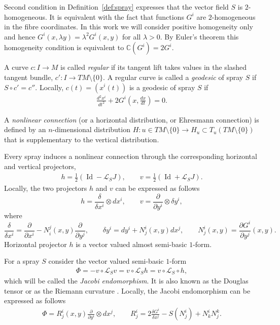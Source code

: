 Second condition in Def\/inition~\ref{def:spray} expresses that the
vector f\/ield $S$ is $2$-homogeneous. It is equivalent with the
fact that functions $G^i$ are $2$-homogeneous in the f\/ibre
coordinates. In this work we will consider positive homogeneity
only and hence $G^i(x,\lambda y)=\lambda^2 G^i(x,y)$
for all $\lambda>0$. By Euler's theorem this homogeneity condition is equivalent to
$\mathbb{C}(G^i)=2G^i$.

A curve $c:I \to M$ is called \emph{regular} if its tangent lift takes
values in the slashed tangent bundle, $c': I \to
TM\setminus\{0\}$. A regular curve is called a \emph{geodesic} of
spray $S$ if $S\circ c'=c''$. Locally, $c(t)=(x^i(t))$ is a
geodesic of spray $S$ if
\begin{gather*}
\frac{d^2x^i}{dt^2}+2G^i\left(x,\frac{dx}{dt}\right)=0.
\end{gather*}

\begin{Definition} A \emph{nonlinear connection} (or a horizontal
distribution, or Ehresmann connection) is def\/ined by an
$n$-dimensional distribution $H: u\in TM\setminus\{0\} \to
H_u\subset T_u(TM\setminus\{0\})$ that is supplementary to the
vertical distribution. \end{Definition}

Every spray induces a nonlinear connection through the
corresponding horizontal and vertical projectors, \cite{grifone72}
\begin{gather*}
h=\frac{1}{2}\left(\operatorname{Id}-\mathcal{L}_SJ\right), \qquad
v=\frac{1}{2}\left(\operatorname{Id}+\mathcal{L}_SJ\right).
\end{gather*} Locally, the two projectors $h$ and $v$ can
be expressed as follows
\[
h=\frac{\delta}{\delta x^i} \otimes dx^i, \qquad
v=\frac{\partial}{\partial y^i}\otimes \delta y^i,
\] where
\[
\frac{\delta}{\delta x^i}=\frac{\partial}{\partial
x^i}-N^j_i(x,y)\frac{\partial}{\partial y^j}, \qquad \delta y^i=dy^i+
N^i_j(x,y)dx^j, \qquad N^i_j(x,y)=\frac{\partial G^i}{\partial y^j}(x,y).
\]
Horizontal projector $h$ is a vector valued almost semi-basic
$1$-form.

For a spray $S$ consider the vector valued
semi-basic $1$-form
\begin{gather*}
\Phi=-v\circ \mathcal{L}_Sv = v\circ \mathcal{L}_Sh=v\circ
\mathcal{L}_S \circ h,
\end{gather*} which will be called the
\emph{Jacobi endomorphism}. It is also known as the Douglas tensor
\cite[Def\/inition~3.17]{grifone00} or as the Riemann curvature \cite[Def\/inition~8.1.2]{shen01}.
 Locally, the Jacobi endomorphism can be expressed as follows
\begin{gather*}
\Phi= R^i_j(x,y) \frac{\partial}{\partial y^i}
\otimes dx^j, \qquad R^i_j = 2\frac{\delta G^i}{\delta x^j} -
S(N^i_j) + N^i_kN^k_j. %
\end{gather*}

